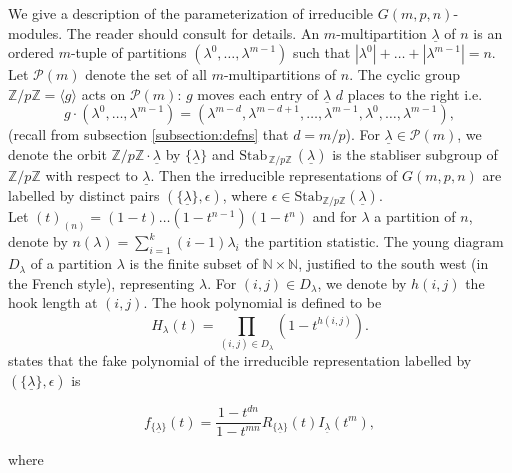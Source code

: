 \documentclass[a4apper,10pt]{amsart}
\theoremstyle{definition}
\numberwithin{thm}{section}
\newcommand{\Z}{\mathbb{Z}}
\newcommand{\N}{\mathbb{N}}
\begin{document}
\noindent We give a description of the parameterization of irreducible $G(m,p,n)$-modules. The reader should consult \cite[pages 379-381]{7} for details. An $m$-multipartition $\underline{\lambda}$ of $n$ is an ordered $m$-tuple of partitions $(\lambda^0, \dots ,\lambda^{m-1})$ such that $|\lambda^0| + \dots + |\lambda^{m-1}| = n$. Let $\mathcal{P}(m)$ denote the set of all $m$-multipartitions of $n$. The cyclic group $\Z / p \Z = \langle g \rangle$ acts on $\mathcal{P}(m)$: $g$ moves each entry of $\underline{\lambda}$ $d$ places to the right i.e.
\begin{displaymath}
g \cdot (\lambda^0, \dots, \lambda^{m-1}) = (\lambda^{m-d},\lambda^{m-d+1}, \dots, \lambda^{m-1},\lambda^0, \dots, \lambda^{m-1}),
\end{displaymath}
(recall from subsection \ref{subsection:defns} that $d = m/p$). For $\underline{\lambda} \in \mathcal{P}(m)$, we denote the orbit $\Z/p\Z \cdot \underline{\lambda}$ by $\{ \underline{\lambda} \}$ and $\textrm{Stab}_{\, \Z/p\Z} \, (\underline{\lambda})$ is the stabliser subgroup of $\Z/p\Z$ with respect to $\underline{\lambda}$. Then the irreducible representations of $G(m,p,n)$ are labelled by distinct pairs $(\{ \underline{\lambda} \},\epsilon)$, where $\epsilon \in \textrm{Stab}_{\Z/p\Z}(\underline{\lambda})$.\\

\noindent Let $(t)_{(n)} = (1 - t) \dots (1 - t^{n-1})(1 - t^n)$ and for $\lambda$ a partition of $n$, denote by $n(\lambda) = \sum_{i = 1}^k (i-1)\lambda_i$ the partition statistic. The young diagram $D_{\lambda}$ of a partition $\lambda$ is the finite subset of $\N \times \N$, justified to the south west (in the French style), representing $\lambda$. For $(i,j) \in D_\lambda$, we denote by $h(i,j)$ the hook length at $(i,j)$. The hook polynomial is defined to be 
\begin{displaymath}
H_{\lambda}(t) = \prod_{(i,j) \in D_\lambda} (1 - t^{h(i,j)}).
\end{displaymath}
\noindent \cite[Corollary 6.4]{7} states that the fake polynomial of the irreducible representation labelled by $(\{ \underline{\lambda} \},\epsilon)$ is

\begin{equation}\label{eq:fake}
f_{\{ \underline{\lambda} \} }(t) = \frac{1 - t^{dn}}{1 - t^{mn}} R_{\{ \underline{\lambda} \} }(t) I_{\underline{\lambda}}(t^m),
\end{equation}

\noindent where 
\end{document}
